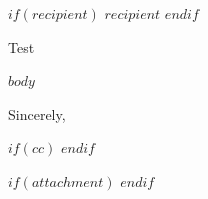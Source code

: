 \documentclass[paper=letter, font=10pt, oneside,
]{scrlttr2}
\begin{document}
    \begin{letter}%
	$if(recipient)$
	{$recipient$}
	$endif$
	
	\opening{Test}

	$body$
	
	\closing{Sincerely,}
   
    $if(cc)$
    $endif$
        
    $if(attachment)$
    $endif$
    \end{letter}
\end{document}
